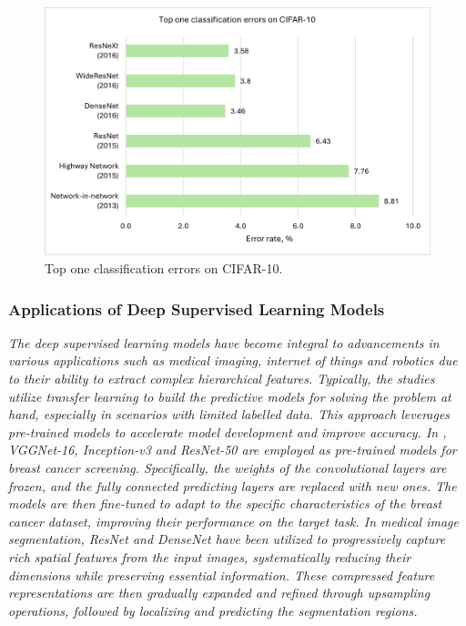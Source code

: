 \documentclass[preprint,12pt]{elsarticle}
\begin{document}
\begin{figure}[h!]
    \centering
    \includegraphics[scale=0.8]{fig_cnn_top_one_errors_cifar10.png}
    \caption{Top one classification errors on CIFAR-10.}
    \label{fig_cnn_top_one_errors_cifar10}
\end{figure}


\subsubsection{Applications of Deep Supervised Learning Models}
\emph{The deep supervised learning models have become integral to advancements in various applications such as medical imaging, internet of things and robotics due to their ability to extract complex hierarchical features. Typically, the studies utilize transfer learning to build the predictive models for solving the problem at hand, especially in scenarios with limited labelled data. This approach leverages pre-trained models to accelerate model development and improve accuracy. In \citep{chougrad_deep_2018}, VGGNet-16, Inception-v3 and ResNet-50 are employed as pre-trained models for breast cancer screening. Specifically, the weights of the convolutional layers are frozen, and the fully connected predicting layers are replaced with new ones. The models are then fine-tuned to adapt to the specific characteristics of the breast cancer dataset, improving their performance on the target task. In medical image segmentation, ResNet \citep{zhao_novel_2020} and DenseNet \citep{cinar_hybrid_2022} have been utilized to progressively capture rich spatial features from the input images, systematically reducing their dimensions while preserving essential information. These compressed feature representations are then gradually expanded and refined through upsampling operations, followed by localizing and predicting the segmentation regions.}
\end{document}
